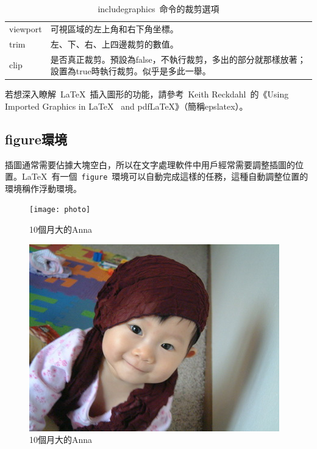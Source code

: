 \begin{table}[htbp]
\caption{includegraphics~命令的裁剪選項}
\label{tab:clip}
\centering
\begin{tabularx}{350pt}{lX}
    \toprule
    viewport & 可視區域的左上角和右下角坐標。\\
    trim & 左、下、右、上四邊裁剪的數值。\\
    clip & 是否真正裁剪。預設為false，不執行裁剪，多出的部分就那樣放著；設置為true時執行裁剪。似乎是多此一舉。\\
    \bottomrule
\end{tabularx}
\end{table}

若想深入瞭解~\LaTeX~插入圖形的功能，請參考~Keith Reckdahl~的《Using Imported Graphics in \LaTeX~ and pdf\LaTeX》\citep{Reckdahl_2006}（簡稱epslatex）。

\subsection{figure環境}
插圖通常需要佔據大塊空白，所以在文字處理軟件中用戶經常需要調整插圖的位置。\LaTeX~有一個~\verb|figure|~環境可以自動完成這樣的任務，這種自動調整位置的環境稱作浮動環境。

\begin{code}
\begin{figure}[htbp]%
\centering
\texttt{[image: photo]}
\caption{10個月大的Anna}
\label{fig:anna}
\end{figure}
\end{code}

\begin{figure}[htbp]
\centering
\includegraphics[bb=0 0 410 307,scale=.8]{dscf4684}
\caption{10個月大的Anna}
\label{fig:anna}
\end{figure}

